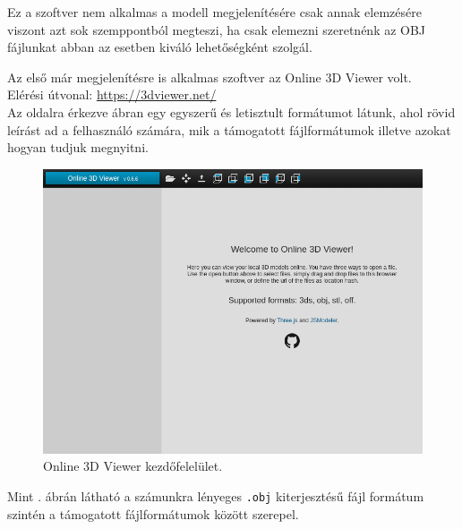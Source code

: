 Ez a szoftver nem alkalmas a modell megjelenítésére csak annak elemzésére viszont azt sok szemppontból megteszi, ha csak elemezni szeretnénk az OBJ fájlunkat abban az esetben kiváló lehetőségként szolgál.
\newpage
{}

Az első már megjelenítésre is alkalmas szoftver az Online 3D Viewer volt.\cite{online2014viktor}\\
Elérési útvonal: \url{https://3dviewer.net/}\\

Az oldalra érkezve  ábran egy egyszerű és letisztult formátumot látunk, ahol rövid leírást ad a felhasználó számára, mik a támogatott fájlformátumok illetve azokat hogyan tudjuk megnyitni.
\bigskip
\begin{figure}[h]
\centering
\includegraphics[width=\textwidth]{images/Model_Viewer.png}
\caption{Online 3D Viewer kezdőfelelület.}
\label{fig:model_viewer1}
\end{figure}
\bigskip

Mint . ábrán látható a számunkra lényeges \texttt{.obj} kiterjesztésű fájl formátum szintén a támogatott fájlformátumok között szerepel.

